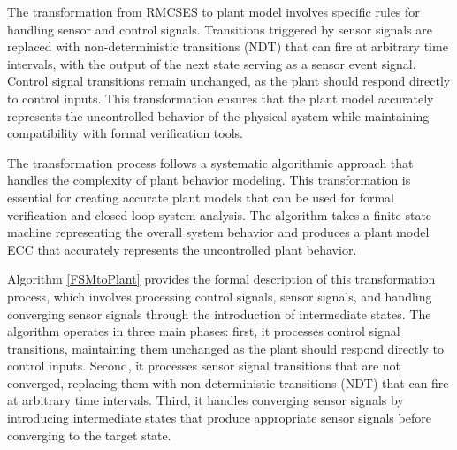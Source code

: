 The transformation from RMCSES to plant model involves specific rules for handling sensor and control signals. Transitions triggered by sensor signals are replaced with non-deterministic transitions (NDT) that can fire at arbitrary time intervals, with the output of the next state serving as a sensor event signal. Control signal transitions remain unchanged, as the plant should respond directly to control inputs. This transformation ensures that the plant model accurately represents the uncontrolled behavior of the physical system while maintaining compatibility with formal verification tools.

The transformation process follows a systematic algorithmic approach that handles the complexity of plant behavior modeling. This transformation is essential for creating accurate plant models that can be used for formal verification and closed-loop system analysis. The algorithm takes a finite state machine representing the overall system behavior and produces a plant model ECC that accurately represents the uncontrolled plant behavior.

Algorithm \ref{FSMtoPlant} provides the formal description of this transformation process, which involves processing control signals, sensor signals, and handling converging sensor signals through the introduction of intermediate states. The algorithm operates in three main phases: first, it processes control signal transitions, maintaining them unchanged as the plant should respond directly to control inputs. Second, it processes sensor signal transitions that are not converged, replacing them with non-deterministic transitions (NDT) that can fire at arbitrary time intervals. Third, it handles converging sensor signals by introducing intermediate states that produce appropriate sensor signals before converging to the target state.

